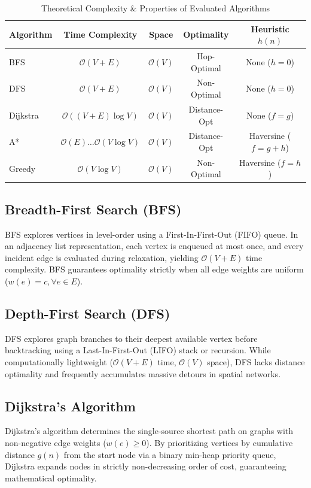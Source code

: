 \documentclass[conference]{IEEEtran}
\begin{document}
\begin{table}[htbp]
\caption{Theoretical Complexity \& Properties of Evaluated Algorithms}
\begin{center}
\begin{tabular}{lcccc}
\toprule
\textbf{Algorithm} & \textbf{Time Complexity} & \textbf{Space} & \textbf{Optimality} & \textbf{Heuristic $h(n)$} \\
\midrule
BFS & $\mathcal{O}(V + E)$ & $\mathcal{O}(V)$ & Hop-Optimal & None ($h=0$) \\
DFS & $\mathcal{O}(V + E)$ & $\mathcal{O}(V)$ & Non-Optimal & None ($h=0$) \\
Dijkstra & $\mathcal{O}((V+E)\log V)$ & $\mathcal{O}(V)$ & Distance-Opt & None ($f=g$) \\
A* & $\mathcal{O}(E) \dots \mathcal{O}(V\log V)$ & $\mathcal{O}(V)$ & Distance-Opt & Haversine ($f=g+h$) \\
Greedy & $\mathcal{O}(V\log V)$ & $\mathcal{O}(V)$ & Non-Optimal & Haversine ($f=h$) \\
\bottomrule
\end{tabular}
\label{tab:complexity}
\end{center}
\end{table}

\subsection{Breadth-First Search (BFS)}
BFS explores vertices in level-order using a First-In-First-Out (FIFO) queue. In an adjacency list representation, each vertex is enqueued at most once, and every incident edge is evaluated during relaxation, yielding $\mathcal{O}(V+E)$ time complexity. BFS guarantees optimality strictly when all edge weights are uniform ($w(e) = c, \forall e \in E$).

\subsection{Depth-First Search (DFS)}
DFS explores graph branches to their deepest available vertex before backtracking using a Last-In-First-Out (LIFO) stack or recursion. While computationally lightweight ($\mathcal{O}(V+E)$ time, $\mathcal{O}(V)$ space), DFS lacks distance optimality and frequently accumulates massive detours in spatial networks.

\subsection{Dijkstra's Algorithm}
Dijkstra's algorithm determines the single-source shortest path on graphs with non-negative edge weights ($w(e) \ge 0$). By prioritizing vertices by cumulative distance $g(n)$ from the start node via a binary min-heap priority queue, Dijkstra expands nodes in strictly non-decreasing order of cost, guaranteeing mathematical optimality.
\end{document}
